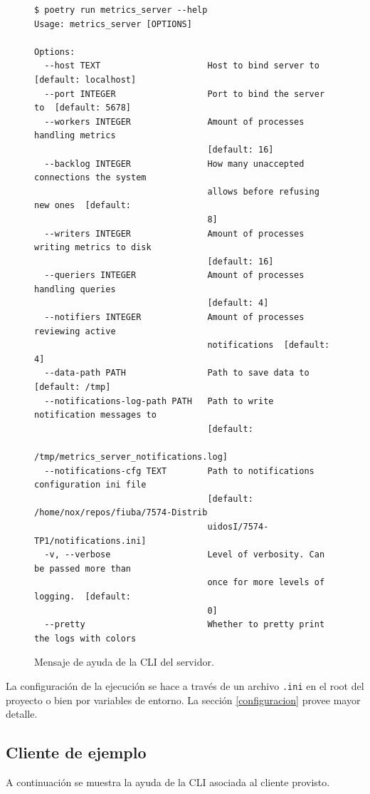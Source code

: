 \documentclass[a4paper,oneside]{article}
\begin{document}
\begin{figure}[H]
\begin{verbatim}
$ poetry run metrics_server --help
Usage: metrics_server [OPTIONS]

Options:
  --host TEXT                     Host to bind server to  [default: localhost]
  --port INTEGER                  Port to bind the server to  [default: 5678]
  --workers INTEGER               Amount of processes handling metrics
                                  [default: 16]
  --backlog INTEGER               How many unaccepted connections the system
                                  allows before refusing new ones  [default:
                                  8]
  --writers INTEGER               Amount of processes writing metrics to disk
                                  [default: 16]
  --queriers INTEGER              Amount of processes handling queries
                                  [default: 4]
  --notifiers INTEGER             Amount of processes reviewing active
                                  notifications  [default: 4]
  --data-path PATH                Path to save data to  [default: /tmp]
  --notifications-log-path PATH   Path to write notification messages to
                                  [default:
                                  /tmp/metrics_server_notifications.log]
  --notifications-cfg TEXT        Path to notifications configuration ini file
                                  [default: /home/nox/repos/fiuba/7574-Distrib
                                  uidosI/7574-TP1/notifications.ini]
  -v, --verbose                   Level of verbosity. Can be passed more than
                                  once for more levels of logging.  [default:
                                  0]
  --pretty                        Whether to pretty print the logs with colors
\end{verbatim}
\caption{Mensaje de ayuda de la CLI del servidor.}
\end{figure}

La configuración de la ejecución se hace a través de un archivo \texttt{.ini} en el root del proyecto o bien por variables de entorno. La sección \ref{configuracion} provee mayor detalle.

\subsection{Cliente de ejemplo}
A continuación se muestra la ayuda de la CLI asociada al cliente provisto.
\end{document}
